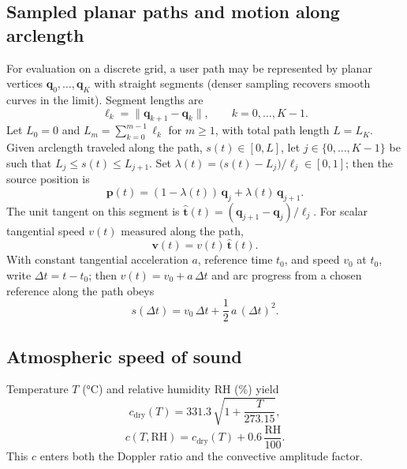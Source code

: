 \documentclass{article}
\begin{document}
\subsection{Sampled planar paths and motion along arclength}

For evaluation on a discrete grid, a user path may be represented by planar vertices $\mathbf{q}_0,\ldots,\mathbf{q}_K$ with straight segments (denser sampling recovers smooth curves in the limit).
Segment lengths are
\begin{equation}
  \ell_k = \bigl\|\mathbf{q}_{k+1}-\mathbf{q}_k\bigr\|,
  \qquad k=0,\ldots,K-1.
\end{equation}
Let $L_0=0$ and $L_m=\sum_{k=0}^{m-1}\ell_k$ for $m\ge1$, with total path length $L=L_K$.
Given arclength traveled along the path, $s(t)\in[0,L]$, let $j\in\{0,\ldots,K-1\}$ be such that $L_j\le s(t)\le L_{j+1}$.
Set $\lambda(t)=\bigl(s(t)-L_j\bigr)/\ell_j\in[0,1]$; then the source position is
\begin{equation}
  \mathbf{p}(t) = (1-\lambda(t))\,\mathbf{q}_j + \lambda(t)\,\mathbf{q}_{j+1}.
\end{equation}
The unit tangent on this segment is $\hat{\mathbf{t}}(t)=(\mathbf{q}_{j+1}-\mathbf{q}_j)/\ell_j$.
For scalar tangential speed $v(t)$ measured along the path,
\begin{equation}
  \mathbf{v}(t) = v(t)\,\hat{\mathbf{t}}(t).
\end{equation}
With constant tangential acceleration $a$, reference time $t_0$, and speed $v_0$ at $t_0$, write $\Delta t=t-t_0$; then $v(t)=v_0+a\,\Delta t$ and arc progress from a chosen reference along the path obeys
\begin{equation}
  s(\Delta t) = v_0\,\Delta t + \frac{1}{2}\,a\,(\Delta t)^2 .
\end{equation}

\subsection{Atmospheric speed of sound}

Temperature $T$ (\si{\celsius}) and relative humidity $\mathrm{RH}$ (\si{\percent}) yield
\begin{equation}
  c_{\mathrm{dry}}(T) = 331.3 \,\sqrt{1 + \frac{T}{273.15}},
\end{equation}
\begin{equation}
  c(T,\mathrm{RH}) = c_{\mathrm{dry}}(T) + 0.6 \,\frac{\mathrm{RH}}{100}.
\end{equation}
This $c$ enters both the Doppler ratio and the convective amplitude factor.
\end{document}
